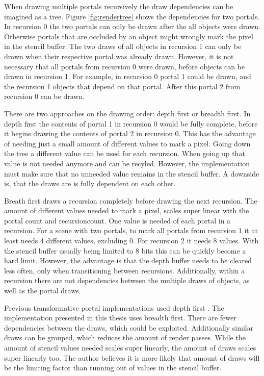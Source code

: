 When drawing multiple portals recursively the draw dependencies can be imagined as a tree. Figure \ref{fig:rendertree} shows the dependencies for two portals. In recursion 0 the two portals can only be drawn after the all objects were drawn. Otherwise portals that are occluded by an object might wrongly mark the pixel in the stencil buffer. The two draws of all objects in recursion 1 can only be drawn when their respective portal was already drawn. However, it is not necessary that all portals from recursion 0 were drawn, before objects can be drawn in recursion 1. For example, in recursion 0 portal 1 could be drawn, and the recursion 1 objects that depend on that portal. After this portal 2 from recursion 0 can be drawn.

There are two approaches on the drawing order: depth first or breadth first. In depth first the contents of portal 1 in recursion 0 would be fully complete, before it begins drawing the contents of portal 2 in recursion 0. This has the advantage of needing just a small amount of different values to mark a pixel. Going down the tree a different value can be used for each recursion. When going up that value is not needed anymore and can be recyled. However, the implementation must make sure that no unneeded value remains in the stencil buffer. A downside is, that the draws are is fully dependent on each other.

Breath first draws a recursion completely before drawing the next recursion. The amount of different values needed to mark a pixel, scales super linear with the portal count and \gls{recursioncount}. One value is needed of each portal in a recursion. For a scene with two portals, to mark all portals from recursion 1 it at least needs 4 different values, excluding 0. For recursion 2 it needs 8 values. With the stencil buffer usually being limited to 8 bits this can be quickly become a hard limit. However, the advantage is that the depth buffer needs to be cleared less often, only when transitioning between recursions. Additionally, within a recursion there are not dependencies between the multiple draws of objects, as well as the portal draws.

Previous transformative portal implementations used depth first \cite{lowe:2005:technique,lecture:portalProblems}. The implementation presented in this thesis uses breadth first. There are fewer dependencies between the draws, which could be exploited. Additionally similar draws can be grouped, which reduces the amount of render passes. While the amount of stencil values needed scales super linearly, the amount of draws scales super linearly too. The author believes it is more likely that amount of draws will be the limiting factor than running out of values in the stencil buffer.



